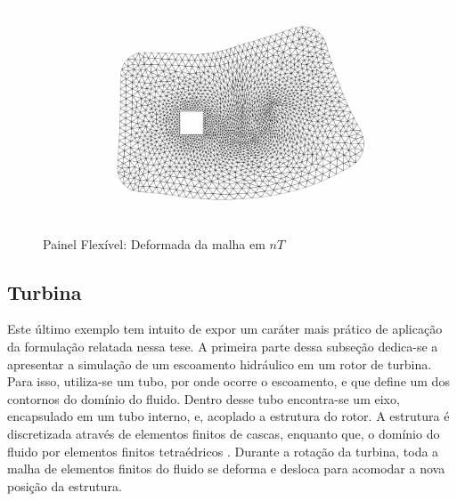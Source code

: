 \begin{figure}[!htbp]
	\label{fig:prism_campos_press}
\end{figure}

\begin{figure}[!htbp]
	\caption{Painel Flexível: Deformada da malha em $nT$}
	\centering 
	\includegraphics[scale=1.0,trim=1cm 0.2cm 1cm 0.2cm, clip=true]{Imagens/Cap7/prism_malha_def.pdf}	
	\label{fig:prisma_defor_malha}
\end{figure}

\subsection{Turbina}

Este último exemplo tem intuito de expor um caráter mais prático de aplicação da formulação relatada nessa tese. A primeira parte dessa subseção dedica-se a apresentar a simulação de um escoamento hidráulico em um rotor de turbina. Para isso, utiliza-se um tubo, por onde ocorre o escoamento, e que define um dos contornos do domínio do fluido. Dentro desse tubo encontra-se um eixo, encapsulado em um tubo interno, e, acoplado a estrutura do rotor. A estrutura é discretizada através de elementos finitos de cascas, enquanto que, o domínio do fluido por elementos finitos tetraédricos . Durante a rotação da turbina, toda a malha de elementos finitos do fluido se deforma e desloca para acomodar a nova posição da estrutura.

